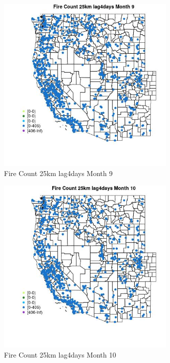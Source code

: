 \begin{figure} 
\centering  
\includegraphics[width=0.77\textwidth]{Code_Outputs/Report_ML_input_PM25_Step4_part_f_de_duplicated_aveswNAs_MapObsMo9Fire_Count_25km_lag4days.jpg} 
\caption{\label{fig:Report_ML_input_PM25_Step4_part_f_de_duplicated_aveswNAsMapObsMo9Fire_Count_25km_lag4days}Fire Count 25km lag4days Month 9} 
\end{figure} 
 

\begin{figure} 
\centering  
\includegraphics[width=0.77\textwidth]{Code_Outputs/Report_ML_input_PM25_Step4_part_f_de_duplicated_aveswNAs_MapObsMo10Fire_Count_25km_lag4days.jpg} 
\caption{\label{fig:Report_ML_input_PM25_Step4_part_f_de_duplicated_aveswNAsMapObsMo10Fire_Count_25km_lag4days}Fire Count 25km lag4days Month 10} 
\end{figure} 
 

